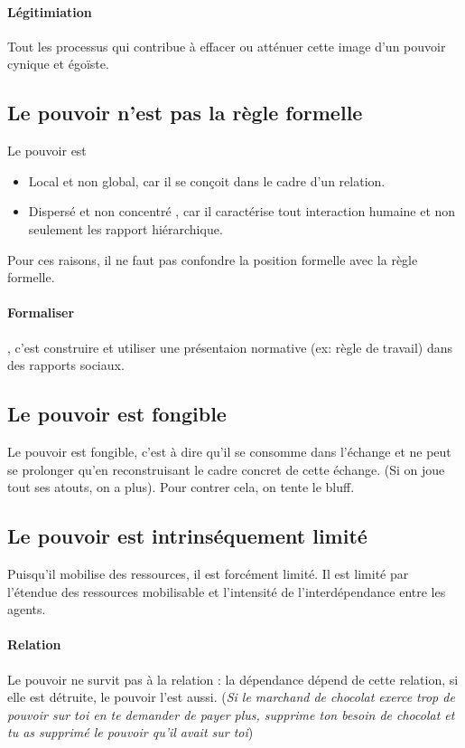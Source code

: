 \documentclass[11pt]{article} %
\begin{document}
\paragraph{Légitimiation} Tout les processus qui contribue à effacer
ou atténuer cette image d'un pouvoir cynique et égoïste.


\subsection{Le pouvoir n'est pas la règle formelle}
Le pouvoir est
\begin{itemize}
	\item Local et non global, car il se conçoit dans le cadre d'un relation.
	\item Dispersé et non concentré , car il caractérise tout interaction humaine et non 
	seulement les rapport hiérarchique.
\end{itemize}

Pour ces raisons, il ne faut pas confondre la position formelle
avec la règle formelle. 

\paragraph{Formaliser}, c'est construire et utiliser une présentaion
normative (ex: règle de travail) dans des rapports sociaux.

\subsection{Le pouvoir est fongible}

Le pouvoir est fongible, c'est à dire qu'il se consomme dans l'échange
et ne peut se prolonger qu'en reconstruisant le cadre concret de cette
échange. (Si on joue tout ses atouts, on a plus). Pour contrer cela, on
tente le bluff.

\subsection{Le pouvoir est intrinséquement limité}

Puisqu'il mobilise des ressources, il est forcément limité. Il est
limité par l'étendue des ressources mobilisable et l'intensité de
l'interdépendance entre les agents.

\paragraph{Relation} Le pouvoir ne survit pas à la relation : la
dépendance dépend de cette relation, si elle est détruite, le pouvoir
l'est aussi. (\textit{Si le marchand de chocolat exerce trop de pouvoir
sur toi en te demander de payer plus, supprime ton besoin de
chocolat et tu as supprimé le pouvoir qu'il avait sur toi})
\end{document}
